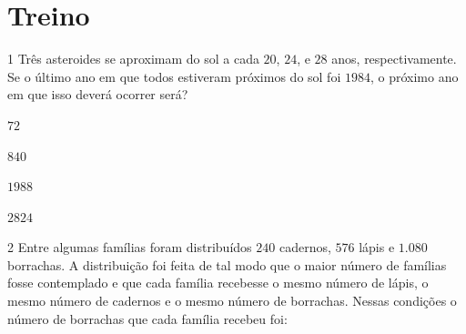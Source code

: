 

\section{Treino}

\num{1}  Três asteroides se aproximam do sol a cada $20$, $24$, e $28$ anos,
respectivamente. Se o último ano em que todos estiveram próximos do sol
foi $1984$, o próximo ano em que isso deverá ocorrer será?

\begin{escolha}
\item
  $72$
\item
  $840$
\item
  $1988$
\item
  $2824$
\end{escolha}



\num{2}  Entre algumas famílias foram distribuídos $240$ cadernos, $576$ lápis e
$1.080$ borrachas. A distribuição foi feita de tal modo que o maior número
de famílias fosse contemplado e que cada família recebesse o mesmo
número de lápis, o mesmo número de cadernos e o mesmo número de
borrachas. Nessas condições o número de borrachas que cada família
recebeu foi:

